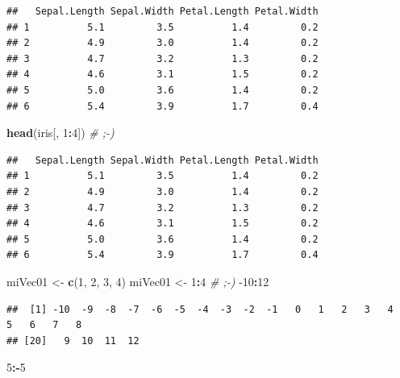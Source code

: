 \documentclass[
]{book}
\newenvironment{Shaded}{\begin{snugshade}}{\end{snugshade}}
\newcommand{\CommentTok}[1]{\textcolor[rgb]{0.56,0.35,0.01}{\textit{#1}}}
\newcommand{\DecValTok}[1]{\textcolor[rgb]{0.00,0.00,0.81}{#1}}
\newcommand{\KeywordTok}[1]{\textcolor[rgb]{0.13,0.29,0.53}{\textbf{#1}}}
\newcommand{\NormalTok}[1]{#1}
\newcommand{\OperatorTok}[1]{\textcolor[rgb]{0.81,0.36,0.00}{\textbf{#1}}}
\newcommand{\StringTok}[1]{\textcolor[rgb]{0.31,0.60,0.02}{#1}}
\begin{document}
\begin{verbatim}
##   Sepal.Length Sepal.Width Petal.Length Petal.Width
## 1          5.1         3.5          1.4         0.2
## 2          4.9         3.0          1.4         0.2
## 3          4.7         3.2          1.3         0.2
## 4          4.6         3.1          1.5         0.2
## 5          5.0         3.6          1.4         0.2
## 6          5.4         3.9          1.7         0.4
\end{verbatim}

\begin{Shaded}
\begin{Highlighting}[]
\KeywordTok{head}\NormalTok{(iris[, }\DecValTok{1}\OperatorTok{:}\DecValTok{4}\NormalTok{]) }\CommentTok{# ;-)}
\end{Highlighting}
\end{Shaded}

\begin{verbatim}
##   Sepal.Length Sepal.Width Petal.Length Petal.Width
## 1          5.1         3.5          1.4         0.2
## 2          4.9         3.0          1.4         0.2
## 3          4.7         3.2          1.3         0.2
## 4          4.6         3.1          1.5         0.2
## 5          5.0         3.6          1.4         0.2
## 6          5.4         3.9          1.7         0.4
\end{verbatim}

\begin{Shaded}
\begin{Highlighting}[]
\NormalTok{miVec01 <-}\StringTok{ }\KeywordTok{c}\NormalTok{(}\DecValTok{1}\NormalTok{, }\DecValTok{2}\NormalTok{, }\DecValTok{3}\NormalTok{, }\DecValTok{4}\NormalTok{)}
\NormalTok{miVec01 <-}\StringTok{ }\DecValTok{1}\OperatorTok{:}\DecValTok{4} \CommentTok{# ;-)}
\DecValTok{-10}\OperatorTok{:}\DecValTok{12}
\end{Highlighting}
\end{Shaded}

\begin{verbatim}
##  [1] -10  -9  -8  -7  -6  -5  -4  -3  -2  -1   0   1   2   3   4   5   6   7   8
## [20]   9  10  11  12
\end{verbatim}

\begin{Shaded}
\begin{Highlighting}[]
\DecValTok{5}\OperatorTok{:-}\DecValTok{5}
\end{Highlighting}
\end{Shaded}
\end{document}
